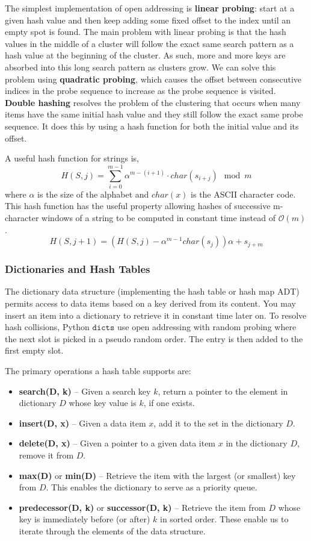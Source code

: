 \documentclass{article}
\newcommand{\bigO}{\mathcal{O}}
\begin{document}
    The simplest implementation of open addressing is \textbf{linear probing}: start at a given hash value and then keep adding some fixed offset to the index until an empty spot is found. The main problem with linear probing is that the hash values in the middle of a cluster will follow the exact same search pattern as a hash value at the beginning of the cluster. As such, more and more keys are absorbed into this long search pattern as clusters grow. We can solve this problem using \textbf{quadratic probing}, which causes the offset between consecutive indices in the probe sequence to increase as the probe sequence is visited. \textbf{Double hashing} resolves the problem of the clustering that occurs when many items have the same initial hash value and they still follow the exact same probe sequence. It does this by using a hash function for both the initial value and its offset.

    A useful hash function for strings is,
    \[
        H(S,j) = \sum_{i=0}^{m-1} \alpha^{m-(i+1)} \cdot char(s_{i+j}) \mod m
    \]
    where $\alpha$ is the size of the alphabet and $char(x)$ is the ASCII character code. This hash function has the useful property allowing hashes of successive m-character windows of a string to be computed in constant time instead of $\bigO(m)$.
    \[
        H(S, j+1) = (H(S,j) - \alpha^{m-1}char(s_j))\alpha + s_{j+m}
    \]
    
    \subsubsection{Dictionaries and Hash Tables}
    The dictionary data structure (implementing the hash table or hash map ADT) permits access to data items based on a key derived from its content. You may insert an item into a dictionary to retrieve it in constant time later on. To resolve hash collisions, Python $\mathtt{dicts}$ use open addressing with random probing where the next slot is picked in a pseudo random order. The entry is then added to the first empty slot.
    
    The primary operations a hash table supports are:
    \begin{itemize}
        \item  \textbf{search(D, k)} – Given a search key $k$, return a pointer to the element in dictionary $D$ whose key value is $k$, if one exists.
        \item \textbf{insert(D, x)} – Given a data item $x$, add it to the set in the dictionary $D$.
        \item \textbf{delete(D, x)} – Given a pointer to a given data item $x$ in the dictionary $D$, remove it from $D$.
        \item \textbf{max(D)} or \textbf{min(D)} – Retrieve the item with the largest (or smallest) key from $D$. This enables the dictionary to serve as a priority queue.
        \item \textbf{predecessor(D, k)} or \textbf{successor(D, k)} – Retrieve the item from $D$ whose key is immediately before (or after) $k$ in sorted order. These enable us to iterate through the elements of the data structure.
    \end{itemize}
    
\end{document}
